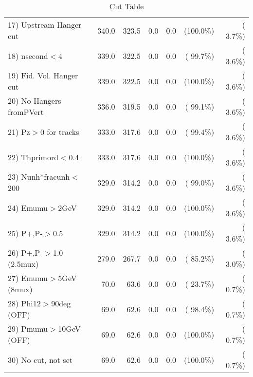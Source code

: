 \begin{table}[h!]
\begin{tabular}{||l||r|r|r|r|r|r||}
 17) Upstream Hanger cut  &        340.0 &        323.5 &          0.0 &          0.0 & (100.0\%) & (  3.7\%) \\
 18) nsecond$<$4          &        339.0 &        322.5 &          0.0 &          0.0 & ( 99.7\%) & (  3.6\%) \\
 19) Fid. Vol. Hanger cut &        339.0 &        322.5 &          0.0 &          0.0 & (100.0\%) & (  3.6\%) \\
 20) No Hangers fromPVert &        336.0 &        319.5 &          0.0 &          0.0 & ( 99.1\%) & (  3.6\%) \\
 21) Pz$>$0 for tracks    &        333.0 &        317.6 &          0.0 &          0.0 & ( 99.4\%) & (  3.6\%) \\
 22) Thprimord$<$0.4      &        333.0 &        317.6 &          0.0 &          0.0 & (100.0\%) & (  3.6\%) \\
 23) Nunh*fracunh$<$200   &        329.0 &        314.2 &          0.0 &          0.0 & ( 99.0\%) & (  3.6\%) \\
 24) Emumu$>$2GeV         &        329.0 &        314.2 &          0.0 &          0.0 & (100.0\%) & (  3.6\%) \\
 25) P+,P-$>$0.5          &        329.0 &        314.2 &          0.0 &          0.0 & (100.0\%) & (  3.6\%) \\
 26) P+,P-$>$1.0 (2.5mux) &        279.0 &        267.7 &          0.0 &          0.0 & ( 85.2\%) & (  3.0\%) \\
 27) Emumu$>$5GeV  (8mux) &         70.0 &         63.6 &          0.0 &          0.0 & ( 23.7\%) & (  0.7\%) \\
 28) Phi12$>$90deg  (OFF) &         69.0 &         62.6 &          0.0 &          0.0 & ( 98.4\%) & (  0.7\%) \\
 29) Pmumu$>$10GeV  (OFF) &         69.0 &         62.6 &          0.0 &          0.0 & (100.0\%) & (  0.7\%) \\
 30) No cut, not set      &         69.0 &         62.6 &          0.0 &          0.0 & (100.0\%) & (  0.7\%) \\
 \hline
 \hline
 \end{tabular}
 \caption{Cut Table           }
 \label{tab-cutcohjpsi-mumu_jpsi}
 \end{table}
